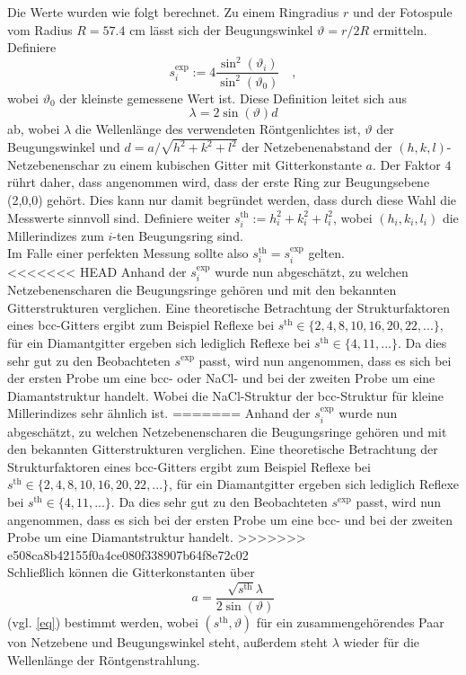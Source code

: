 Die Werte wurden wie folgt berechnet. Zu einem Ringradius $r$ und der Fotospule vom
Radius $R=57.4 \text{ cm}$ lässt sich der Beugungswinkel $\vartheta=r/2R$ ermitteln.
Definiere
\begin{equation}
s_i^\text{exp}:=4 \frac{\sin^2(\vartheta_i)}{\sin^2(\vartheta_0)} \quad ,
\end{equation}
wobei $\vartheta_0$ der kleinste gemessene Wert ist. Diese Definition leitet sich
aus
\begin{equation}
\lambda=2\sin(\vartheta) d \label{eq}
\end{equation}
ab, wobei $\lambda$ die Wellenlänge des verwendeten Röntgenlichtes ist, $\vartheta$ der Beugungswinkel und $d=a/\sqrt{h^2+k^2+l^2}$ der Netzebenenabstand der $(h,k,l)$-
Netzebenenschar zu einem kubischen Gitter mit Gitterkonstante $a$. Der Faktor $4$ rührt daher, dass angenommen wird, dass der erste Ring zur
Beugungsebene (2,0,0) gehört. Dies kann nur damit begründet werden, dass durch diese
Wahl die Messwerte sinnvoll sind.
Definiere weiter $s^\text{th}_i:=h_i^2+k_i^2+l_i^2$, wobei $(h_i,k_i,l_i)$ die
Millerindizes zum $i$-ten Beugungsring sind.\\
Im Falle einer perfekten Messung sollte also $s_i^\text{th}=s_i^\text{exp}$ gelten.
\\
<<<<<<< HEAD
Anhand der $s_i^\text{exp}$ wurde nun abgeschätzt, zu welchen Netzebenenscharen die 
Beugungsringe gehören und mit den bekannten Gitterstrukturen verglichen. Eine 
theoretische Betrachtung der Strukturfaktoren eines bcc-Gitters ergibt zum Beispiel 
Reflexe bei $s^\text{th} \in \{ 2,4,8,10,16,20,22,... \}$, für ein Diamantgitter 
ergeben sich lediglich Reflexe bei $s^\text{th}\in \{ 4,11,... \}$. Da dies sehr gut 
zu den Beobachteten $s^\text{exp}$ passt, wird nun angenommen, dass es sich bei der 
ersten Probe um eine bcc- oder NaCl- und bei der zweiten Probe um eine 
Diamantstruktur handelt. Wobei die NaCl-Struktur der bcc-Struktur für kleine 
Millerindizes sehr ähnlich ist.
=======
Anhand der $s_i^\text{exp}$ wurde nun abgeschätzt, zu welchen Netzebenenscharen die
Beugungsringe gehören und mit den bekannten Gitterstrukturen verglichen. Eine
theoretische Betrachtung der Strukturfaktoren eines bcc-Gitters ergibt zum Beispiel
Reflexe bei $s^\text{th} \in \{ 2,4,8,10,16,20,22,... \}$, für ein Diamantgitter
ergeben sich lediglich Reflexe bei $s^\text{th}\in \{ 4,11,... \}$. Da dies sehr gut
zu den Beobachteten $s^\text{exp}$ passt, wird nun angenommen, dass es sich bei der
ersten Probe um eine bcc- und bei der zweiten Probe um eine Diamantstruktur handelt.
>>>>>>> e508ca8b42155f0a4ce080f338907b64f8e72c02
\\
Schließlich können die Gitterkonstanten über
\begin{equation}
a=\frac{\sqrt{s^\text{th}} \lambda}{2 \sin(\vartheta)}
\end{equation}
(vgl. \eqref{eq}) bestimmt werden, wobei $(s^\text{th},\vartheta)$ für ein
zusammengehörendes Paar von Netzebene und Beugungswinkel steht, außerdem steht
$\lambda$ wieder für die Wellenlänge der Röntgenstrahlung.

